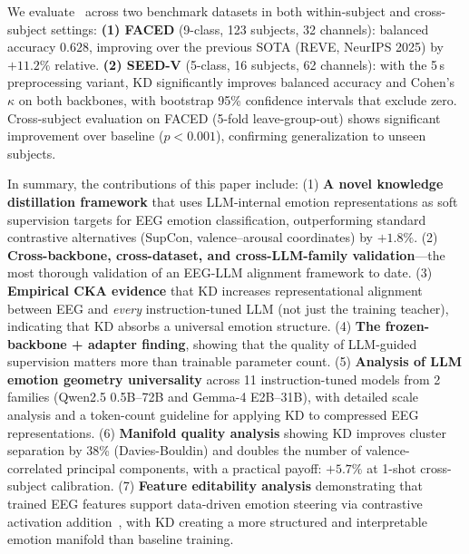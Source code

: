 We evaluate \ours\ across two benchmark datasets in both within-subject and cross-subject settings:
\textbf{(1) FACED} (9-class, 123 subjects, 32 channels): balanced accuracy \(\mathbf{0.628}\), improving over the previous SOTA (REVE, NeurIPS 2025) by \(\mathbf{+11.2\%}\) relative.
\textbf{(2) SEED-V} (5-class, 16 subjects, 62 channels): with the 5\,s preprocessing variant, KD significantly improves balanced accuracy and Cohen's $\kappa$ on both backbones, with bootstrap 95\% confidence intervals that exclude zero.
Cross-subject evaluation on FACED (5-fold leave-group-out) shows significant improvement over baseline ($p < 0.001$), confirming generalization to unseen subjects.

In summary, the contributions of this paper include:
(1) \textbf{A novel knowledge distillation framework} that uses LLM-internal emotion representations as soft supervision targets for EEG emotion classification, outperforming standard contrastive alternatives (SupCon, valence--arousal coordinates) by $+1.8\%$.
(2) \textbf{Cross-backbone, cross-dataset, and cross-LLM-family validation}---the most thorough validation of an EEG-LLM alignment framework to date.
(3) \textbf{Empirical CKA evidence} that KD increases representational alignment between EEG and \emph{every} instruction-tuned LLM (not just the training teacher), indicating that KD absorbs a universal emotion structure.
(4) \textbf{The frozen-backbone + adapter finding}, showing that the quality of LLM-guided supervision matters more than trainable parameter count.
(5) \textbf{Analysis of LLM emotion geometry universality} across 11 instruction-tuned models from 2 families (Qwen2.5 0.5B--72B and Gemma-4 E2B--31B), with detailed scale analysis and a token-count guideline for applying KD to compressed EEG representations.
(6) \textbf{Manifold quality analysis} showing KD improves cluster separation by 38\% (Davies-Bouldin) and doubles the number of valence-correlated principal components, with a practical payoff: $+5.7\%$ at 1-shot cross-subject calibration.
(7) \textbf{Feature editability analysis} demonstrating that trained EEG features support data-driven emotion steering via contrastive activation addition~\cite{rimsky2024steering}, with KD creating a more structured and interpretable emotion manifold than baseline training.
